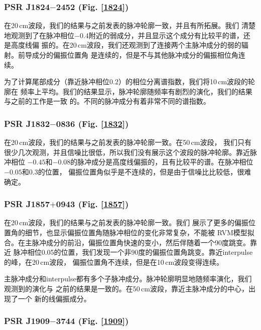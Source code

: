 \subsubsection{PSR J1824$-$2452 (Fig. \ref{1824})}

在20\,cm波段，我们的结果与之前发表的脉冲轮廓一致，并且有所拓展\supercite{Yan11a}。我们
清楚地观测到了在脉冲相位$-0.4$附近的弱成分，并且显示这个成分有比较平的谱，还是高度线偏
振的。在20\,cm波段，我们还观测到了连接两个主脉冲成分的弱的辐射。前导成分的偏振位置角
是连续的，但是不与其他脉冲成分的偏振相位角连续。

为了计算尾部成分（靠近脉冲相位$0.2$）的相位分离谱指数，我们将10\,cm波段的轮廓在
频率上平均。我们的结果显示，脉冲轮廓随频率有剧烈的演化，我们的结果与之前的工作是一致
的\supercite{Stairs99}。不同的脉冲成分有着非常不同的谱指数。

\subsubsection{PSR J1832$-$0836 (Fig. \ref{1832})}

在20\,cm波段，我们的结果与之前发表的脉冲轮廓一致\supercite{Burgay13}。在50\,cm波段，
我们只有很少几次观测，并且信噪比很低，所以我们没有展示这个波段的脉冲轮廓。靠近脉冲相位
$-0.45$和$-0.08$的脉冲成分是高度线偏振的，且有比较平的谱。在脉冲相位$-0.05$和0.3的位置，
偏振位置角似乎是不连续的，但是由于信噪比比较低，很难确定。

\subsubsection{PSR J1857$+$0943 (Fig. \ref{1857})}

在20\,cm波段，我们的结果与之前发表的脉冲轮廓一致\supercite{Xilouris98,Yan11a}。我们
展示了更多的偏振位置角的细节，也显示偏振位置角随脉冲相位的变化非常复杂，不能被
RVM模型拟合。在主脉冲成分的前沿，偏振位置角快速的变小，然后伴随着一个90度跳变。靠近
脉冲相位0.05的位置，我们发现一个非90度的偏振位置角跳变。靠近interpulse的峰，在20\,cm波段，
偏振位置角不连续，但是在10\,cm波段变得连续。

主脉冲成分和interpulse都有多个子脉冲成分。脉冲轮廓明显地随频率演化，我们观测到的演化与
之前的结果是一致的\supercite{Thorsett90}。在50\,cm波段，靠近主脉冲成分的中心，出现了一个
新的线偏振成分。

\subsubsection{PSR J1909$-$3744 (Fig. \ref{1909})}

